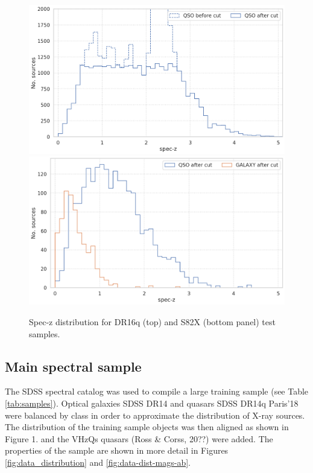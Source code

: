 \documentclass[fleqn,usenatbib]{mnras}
\begin{document}
\begin{figure}
    \centering
    \includegraphics[width=0.95\linewidth]{images/data-dist-dr16q-peaks-cut.png}
    \includegraphics[width=0.95\linewidth]{images/data-dist-s82x.png}
    \caption{Spec-z distribution for DR16q (top) and S82X (bottom panel) test samples.}
    \label{fig:dr16q-peaks-cut}
\end{figure}


\subsection{Main spectral sample}

The SDSS spectral catalog was used to compile a large training sample (see Table \ref{tab:samples}). Optical galaxies SDSS DR14 and quasars SDSS DR14q Paris'18 were balanced by class in order to approximate the distribution of X-ray sources. The distribution of the training sample objects was then aligned as shown in Figure 1. and the VHzQs quasars (Ross \& Corss, 20??) were added. The properties of the sample are shown in more detail in Figures \ref{fig:data_distribution} and \ref{fig:data-dist-mags-ab}.
\end{document}
